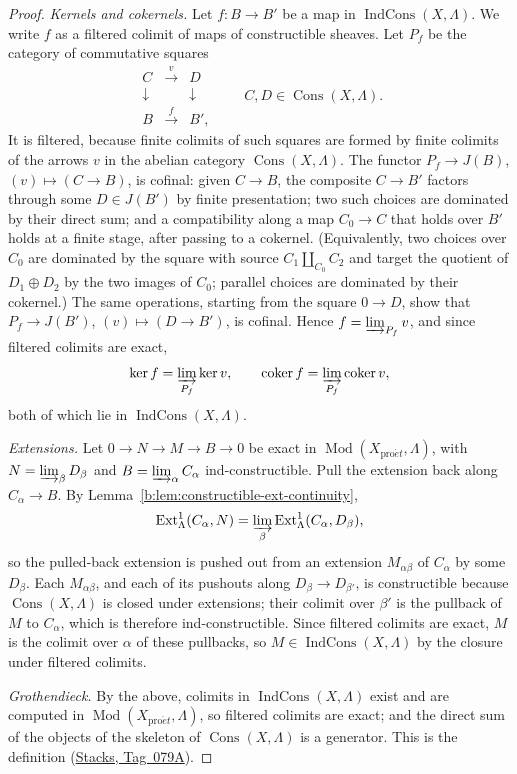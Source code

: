 \documentclass[11pt,a4paper]{article}
\numberwithin{equation}{section}
\theoremstyle{definition}
\theoremstyle{remark}
\newcommand{\Mod}{\operatorname{Mod}}
\newcommand{\proet}{\mathrm{pro}\acute{e}t}
\newcommand{\coker}{\operatorname{coker}}
\newcommand{\stacks}[1]{\href{https://stacks.math.columbia.edu/tag/#1}{\textnormal{Stacks, Tag~#1}}}
\newcommand{\Ext}{\operatorname{Ext}}
\newcommand{\Cons}{\operatorname{Cons}}
\newcommand{\IndCons}{\operatorname{IndCons}}
\begin{document}
\begin{proof}
\emph{Kernels and cokernels.} Let $f:B\to B'$ be a map in
$\IndCons(X,\Lambda)$. We write $f$ as a filtered colimit of maps of
constructible sheaves. Let $P_f$ be the category of commutative squares
\[
 \begin{matrix} C&\xrightarrow{v}&D\\
 \downarrow&&\downarrow\\ B&\xrightarrow{f}&B',\end{matrix}
 \qquad C,D\in\Cons(X,\Lambda).
\]
It is filtered, because finite colimits of such squares are formed by
finite colimits of the arrows $v$ in the abelian category $\Cons(X,\Lambda)$.
The functor $P_f\to J(B)$, $(v)\mapsto(C\to B)$, is cofinal: given
$C\to B$, the composite $C\to B'$ factors through some $D\in J(B')$ by
finite presentation; two such choices are dominated by their direct sum;
and a compatibility along a map $C_0\to C$ that holds over $B'$ holds at
a finite stage, after passing to a cokernel. (Equivalently, two choices
over $C_0$ are dominated by the square with source $C_1\amalg_{C_0}C_2$
and target the quotient of $D_1\oplus D_2$ by the two images of $C_0$;
parallel choices are dominated by their cokernel.) The same operations,
starting from the square $0\to D$, show that $P_f\to J(B')$,
$(v)\mapsto(D\to B')$, is cofinal. Hence $f=\varinjlim_{P_f}v$, and
since filtered colimits are exact,
\[
 \ker f=\varinjlim_{P_f}\ker v,\qquad
 \coker f=\varinjlim_{P_f}\coker v,
\]
both of which lie in $\IndCons(X,\Lambda)$.

\emph{Extensions.} Let $0\to N\to M\to B\to0$ be exact in
$\Mod(X_{\proet},\Lambda)$, with $N=\varinjlim_\beta D_\beta$ and
$B=\varinjlim_\alpha C_\alpha$ ind-constructible. Pull the extension back
along $C_\alpha\to B$. By Lemma~\ref{b:lem:constructible-ext-continuity},
\[
 \Ext^1_{\Lambda}(C_\alpha,N)
 =\varinjlim_\beta\Ext^1_{\Lambda}(C_\alpha,D_\beta),
\]
so the pulled-back extension is pushed out from an extension $M_{\alpha\beta}$
of $C_\alpha$ by some $D_\beta$. Each $M_{\alpha\beta}$, and each of its
pushouts along $D_\beta\to D_{\beta'}$, is constructible because
$\Cons(X,\Lambda)$ is closed under extensions; their colimit over
$\beta'$ is the pullback of $M$ to $C_\alpha$, which is therefore
ind-constructible. Since filtered colimits are exact, $M$ is the colimit
over $\alpha$ of these pullbacks, so $M\in\IndCons(X,\Lambda)$ by the
closure under filtered colimits.

\emph{Grothendieck.} By the above, colimits in $\IndCons(X,\Lambda)$
exist and are computed in $\Mod(X_{\proet},\Lambda)$, so filtered colimits
are exact; and the direct sum of the objects of the skeleton of
$\Cons(X,\Lambda)$ is a generator. This is the definition
(\stacks{079A}).
\end{proof}
\end{document}
